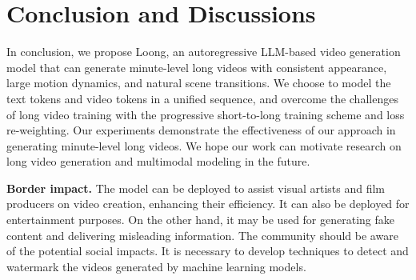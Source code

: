 \section{Conclusion and Discussions}
\label{conclusion}

In conclusion, we propose Loong, an autoregressive LLM-based video generation model that can generate minute-level long videos with consistent appearance, large motion dynamics, and natural scene transitions. We choose to model the text tokens and video tokens in a unified sequence, and overcome the challenges of long video training with the progressive short-to-long training scheme and loss re-weighting. Our experiments demonstrate the effectiveness of our approach in generating minute-level long videos. We hope our work can motivate research on long video generation and multimodal modeling in the future. 

\textbf{Border impact.} The model can be deployed to assist visual artists and film producers on video creation, enhancing their efficiency. It can also be deployed for entertainment purposes. On the other hand, it may be used for generating fake content and delivering misleading information. The community should be aware of the potential social impacts. It is necessary to develop techniques to detect and watermark the videos generated by machine learning models.


